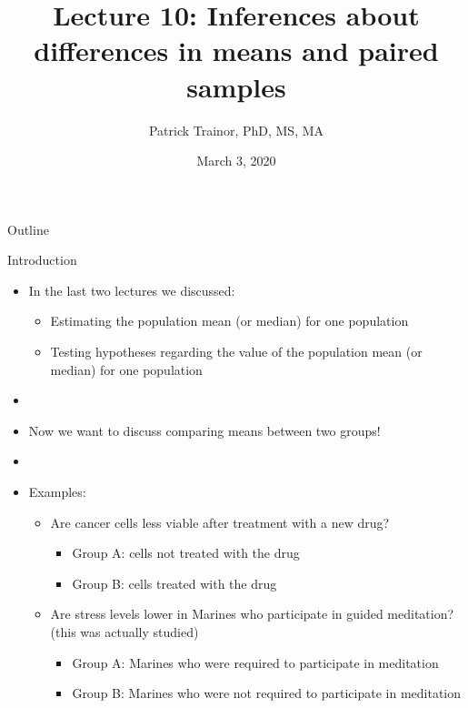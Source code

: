 \documentclass[xcolor=dvipsnames]{beamer}
\title[Lecture 10]{Lecture 10: Inferences about differences in means and paired samples}
\author[Patrick Trainor]{Patrick Trainor, PhD, MS, MA}
\institute[NMSU]{New Mexico State University}
\date{March 3, 2020}
\begin{document}
\begin{frame}
\maketitle
\end{frame}

\begin{frame}{Outline}
\tableofcontents[hideallsubsections]
\end{frame}

\begin{frame}{Introduction}
	\begin{itemize}
		\item In the last two lectures we discussed: \pause
		\begin{itemize}
			\item Estimating the population mean (or median) for one population \pause
			\item Testing hypotheses regarding the value of the population mean (or median) for one population \pause
		\end{itemize}
	\item[]
	\item Now we want to discuss comparing means between two groups! \pause
	\item[]
	\item Examples: \pause
	\begin{itemize}
		\item Are cancer cells less viable after treatment with a new drug?  \pause
			\begin{itemize}
				\item Group A: cells not treated with the drug
				\item Group B: cells treated with the drug \pause
			\end{itemize}
		\item Are stress levels lower in Marines who participate in guided meditation? (this was actually studied) \pause
			\begin{itemize}
				\item Group A: Marines who were required to participate in meditation
				\item Group B: Marines who were not required to participate in meditation
			\end{itemize}
	\end{itemize}
	\end{itemize}
\end{frame}
\end{document}
